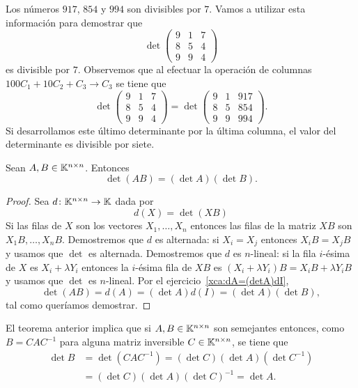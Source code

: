 \begin{example}
    Los números $917$, $854$ y $994$ son divisibles por $7$.
    Vamos a utilizar esta información para demostrar que 
    \[
        \det\begin{pmatrix}
            9 & 1 & 7\\
            8 & 5 & 4\\
            9 & 9 & 4
        \end{pmatrix}
    \]
    es divisible por $7$. Observemos que al efectuar 
    la operación de columnas $100C_1+10C_2+C_3\to C_3$ 
    se tiene que 
    \[
        \det\begin{pmatrix}
            9 & 1 & 7\\
            8 & 5 & 4\\
            9 & 9 & 4
        \end{pmatrix}       
        =
        \det\begin{pmatrix}
            9 & 1 & 917\\
            8 & 5 & 854\\
            9 & 9 & 994
        \end{pmatrix}.
    \]
    Si desarrollamos este último determinante por la última columna, el valor
    del determinante es divisible por siete.
\end{example}

\begin{thm}
    \label{thm:det(AB)=(detA)(detB)}
	Sean $A,B\in\mathbb{K}^{n\times n}$. Entonces 
	\[
		\det(AB)=(\det A)(\det B).
	\]

	\begin{proof}
		Sea $d\colon\mathbb{K}^{n\times n}\to\mathbb{K}$ dada por
		\[
			d(X)=\det(XB)
		\]
        Si las filas de $X$ son los vectores $X_1,\dots,X_n$ entonces las filas
        de la matriz $XB$ son $X_1B,\dots,X_nB$.  Demostremos que $d$ es
        alternada: si $X_i=X_j$ entonces $X_iB=X_jB$ y usamos que $\det$ es
        alternada. Demostremos que $d$ es $n$-lineal: si la fila $i$-ésima de
        $X$ es $X_i+\lambda Y_i$ entonces la $i$-ésima fila de $XB$ es
        $(X_i+\lambda Y_i)B=X_iB+\lambda Y_iB$ y usamos que $\det$ es
        $n$-lineal. Por el ejercicio~\ref{xca:dA=(detA)dI}, 
		\[
		\det(AB)=d(A)=(\det A)d(I)=(\det A)(\det B),
		\]
		tal como queríamos demostrar.
	\end{proof}
\end{thm}

\begin{block}
	\label{block:determinante:semejanza} 
	El teorema anterior implica que si $A,B\in\mathbb{K}^{n\times n}$ son semejantes
	entonces, como $B=CAC^{-1}$ para alguna matriz inversible $C\in\mathbb{K}^{n\times
	n}$, se tiene que 
	\begin{align*}
		\det B &= \det(CAC^{-1})
		=(\det C)(\det A)(\det C^{-1})\\
		&=(\det C)(\det A)(\det C)^{-1}
		=\det A. 
	\end{align*}
\end{block}

